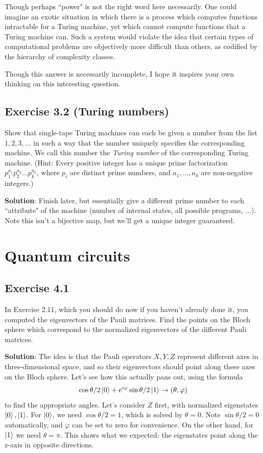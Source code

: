 \documentclass{book}
\begin{document}
    Though perhaps ``power" is not the right word here necessarily. One could imagine an exotic situation in which there is a process which computes functions intractable for a Turing machine, yet which cannot compute functions that a Turing machine can. Such a system would violate the idea that certain types of computational problems are objectively more difficult than others, as codified by the hierarchy of complexity classes.

    Though this answer is necessarily incomplete, I hope it inspires your own thinking on this interesting question.

\section*{Exercise 3.2 (Turing numbers)}
    Show that single-tape Turing machines can each be given a number from the list $1, 2, 3, \dots$ in such a way that the number uniquely specifies the corresponding machine. We call this number the \emph{Turing number} of the corresponding Turing machine. (Hint: Every positive integer has a unique prime factorization $p_1^{a_1} p_2^{a_2} \dots p_k^{a_k}$, where $p_i$ are distinct prime numbers, and $a_1, . . . , a_k$ are non-negative integers.)

    \textbf{Solution}: Finish later, but essentially give a different prime number to each ``attribute" of the machine (number of internal states, all possible programs, ...). Note this isn't a bijective map, but we'll get a unique integer guaranteed.
    

\chapter{Quantum circuits}

\section*{Exercise 4.1}
    In Exercise 2.11, which you should do now if you haven’t already done it, you computed the eigenvectors of the Pauli matrices. Find the points on the Bloch sphere which correspond to the normalized eigenvectors of the different Pauli matrices.
    
    \textbf{Solution}: The idea is that the Pauli operators $X, Y, Z$ represent different axes in three-dimensional space, and so their eigenvectors should point along these axes on the Bloch sphere. Let's see how this actually pans out, using the formula
    \begin{align} \label{eq:ket2bloch}
        \cos\theta/2 \ket{0} + e^{i\varphi}\sin\theta/2 \ket{1} \rightarrow (\theta, \varphi)
    \end{align}
    to find the appropriate angles. Let's consider $Z$ first, with normalized eigenstates $\ket{0}, \ket{1}$. For $\ket{0}$, we need $\cos\theta/2 = 1$, which is solved by $\theta = 0$. Note $\sin\theta/2 = 0$ automatically, and $\varphi$ can be set to zero for convenience. On the other hand, for $\ket{1}$ we need $\theta = \pi$. This shows what we expected: the eigenstates point along the z-axis in opposite directions.
    
\end{document}
